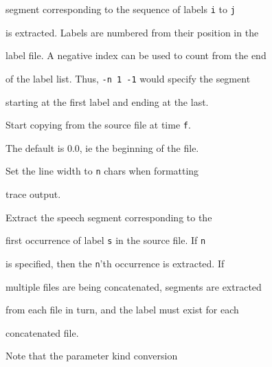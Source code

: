 \begin{optlist}
     segment corresponding to the sequence of labels \texttt{i} to \texttt{j}


     is extracted. Labels are numbered from their position in the


     label file.  A negative index can be used to count from the end


    of the label list.   Thus, \texttt{-n 1 -1} would specify the segment


    starting at the first label and ending at the last.





   Start copying from the source file at time \texttt{f}. 


    The default is 0.0, ie the beginning of the file.





   Set the line width to \texttt{n} chars when formatting


    trace output.





   Extract the speech segment corresponding to the


       first occurrence of label \texttt{s} in the source file.  If \texttt{n}


       is specified, then the \texttt{n}'th occurrence is extracted. If


       multiple files are being concatenated, segments are extracted


       from each file in turn, and the label must exist for each


       concatenated file.





\stdoptF


\stdoptG


\stdoptI


\stdoptL


\stdoptO


\stdoptP


\stdoptX





\end{optlist}







Note that the parameter kind conversion 


